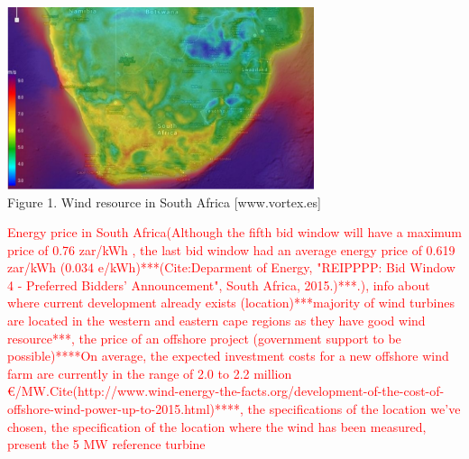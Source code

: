  \begin{center}
\includegraphics[width=9cm]{Images/windafrica.png}\\
Figure 1. Wind resource in South Africa [www.vortex.es]
\end{center}
\textcolor{red}{Energy price in South Africa(Although the fifth bid window will have a maximum price of 0.76 zar/kWh , the last
bid window had an average energy price of 0.619 zar/kWh (0.034 e/kWh)***(Cite:Deparment of Energy, "REIPPPP: Bid Window 4 - Preferred Bidders' Announcement",
South Africa, 2015.)***.), info about where current development already exists (location)***majority of wind turbines are located in the western and eastern cape regions as they have good wind resource***, the price of an offshore project (government support to be possible)****On average, the expected investment costs for a new offshore wind farm are currently in the range of 2.0 to 2.2 million €/MW.Cite(http://www.wind-energy-the-facts.org/development-of-the-cost-of-offshore-wind-power-up-to-2015.html)****, the specifications of the location we've chosen, the specification of the location where the wind has been measured, present the 5 MW reference turbine}